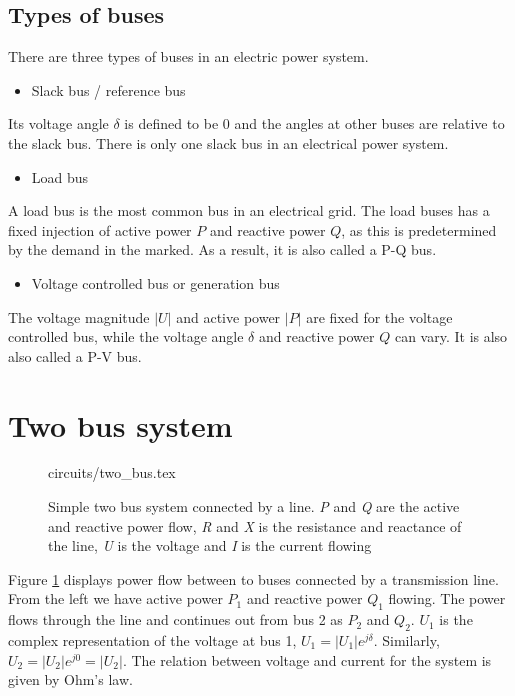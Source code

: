 \documentclass[class=book, crop=false]{standalone}
\begin{document}
\subsection{Types of buses}\label{theory:subsection:bus_types}

There are three types of buses in an electric power system\cite{opf_intro}.

\begin{itemize}
  \item Slack bus / reference bus
\end{itemize}
Its voltage angle $\delta$ is defined to be 0 and the angles at other buses are relative to the slack bus. There is only one slack bus in an electrical power system.

\begin{itemize}
  \item Load bus
\end{itemize}
A load bus is the most common bus in an electrical grid. The load buses has a fixed injection of active power $P$ and reactive power $Q$, as this is predetermined by the demand in the marked. As a result, it is also called a P-Q bus.

\begin{itemize}
  \item Voltage controlled bus or generation bus
\end{itemize}
The voltage magnitude $|U|$ and active power $|P|$ are fixed for the voltage controlled bus, while the voltage angle $\delta$ and reactive power $Q$ can vary. It is also also called a P-V bus. 


\section{Two bus system} 

\begin{figure}[ht!]
    \center
    {circuits/two_bus.tex}
    \caption[size = 9]
    {Simple two bus system connected by a line. \textit{P} and \textit{Q} are the active and reactive power flow, \textit{R} and \textit{X} is the resistance and reactance of the line, \textit{U} is the voltage and \textit{I} is the current flowing}    \label{fig:theory:two_bus}
\end{figure}

Figure \ref{fig:theory:two_bus} displays power flow between to buses connected by a transmission line. From the left we have active power $P_{1}$ and reactive power $Q_{1}$ flowing. The power flows through the line and continues out from bus 2 as $P_{2}$ and $Q_{2}$. $U_{1}$ is the complex representation of the voltage at bus 1, $U_{1} = |U_{1}|e^{j\delta}$. Similarly, $U_{2} = |U_{2}|e^{j0} = |U_{2}|$. The relation between voltage and current for the system is given by Ohm's law.
\end{document}
